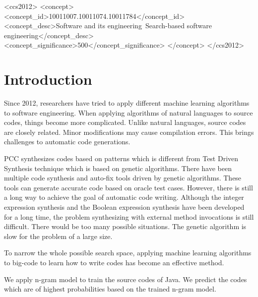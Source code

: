 \documentclass{sig-alternate-05-2015}
\begin{document}
\begin{CCSXML}
<ccs2012>
<concept>
<concept_id>10011007.10011074.10011784</concept_id>
<concept_desc>Software and its engineering~Search-based software engineering</concept_desc>
<concept_significance>500</concept_significance>
</concept>
</ccs2012>
\end{CCSXML}
\printccsdesc

\vspace{-0.1cm}
\vspace{-0.1cm}

\section{Introduction}

Since 2012, researchers have tried to apply different machine learning algorithms to software engineering. When applying algorithms of natural languages to source codes, things become more complicated. Unlike natural languages, source codes are closely related. Minor modifications may cause compilation errors. This brings challenges to automatic code generations.

PCC synthesizes codes based on patterns which is different from Test Driven Synthesis technique which is based on genetic algorithms. There have been multiple code synthesis and auto-fix tools \cite{DBLP:conf/icse/WeimerNGF09}\cite{nguyen2013semfix}\cite{perelman2014test} driven by genetic algorithms. These tools can generate accurate code based on oracle test cases. However, there is still a long way to achieve the goal of automatic code writing. Although the integer expression synthesis and the Boolean expression synthesis have been developed for a long time, the problem synthesizing with external method invocations is still difficult. There would be too many possible situations. The genetic algorithm is slow for the problem of a large size.

To narrow the whole possible search space, applying machine learning algorithms to big-code to learn how to write codes has become an effective method.

We apply n-gram model to train the source codes of Java. We predict the codes which are of highest probabilities based on the trained n-gram model.

\end{document}
